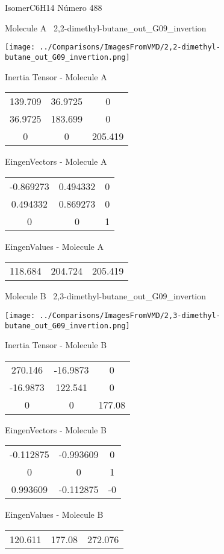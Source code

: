 \vtab[-3cm]
\begin{center}
{\large IsomerC6H14 \tab Número 488}
\end{center}
\begin{multicols}{2}
\begin{center}

Molecule A \
2,2-dimethyl-butane\_out\_G09\_invertion

\texttt{[image: ../Comparisons/ImagesFromVMD/2,2-dimethyl-butane\_out\_G09\_invertion.png]}

Inertia Tensor - Molecule A \\
\begin{tabular}{|c c c|}
139.709	 & 	36.9725	 & 	0	 \\
36.9725	 & 	183.699	 & 	0	 \\
0	 & 	0	 & 	205.419
\end{tabular}

\vtab
 EingenVectors - Molecule A     \\
\begin{tabular}{|c c c|}
-0.869273	 & 	0.494332	 & 	0	 \\
0.494332	 & 	0.869273	 & 	0	 \\
0	 & 	0	 & 	1
\end{tabular}

\vtab
 EingenValues - Molecule A     \\
\begin{tabular}{|c c c|}
118.684	 & 	204.724	 & 	205.419	 \\
\end{tabular}
\columnbreak

Molecule B \
2,3-dimethyl-butane\_out\_G09\_invertion

\texttt{[image: ../Comparisons/ImagesFromVMD/2,3-dimethyl-butane\_out\_G09\_invertion.png]}

Inertia Tensor - Molecule B \\
\begin{tabular}{|c c c|}
270.146	 & 	-16.9873	 & 	0	 \\
-16.9873	 & 	122.541	 & 	0	 \\
0	 & 	0	 & 	177.08
\end{tabular}

\vtab
 EingenVectors - Molecule B     \\
\begin{tabular}{|c c c|}
-0.112875	 & 	-0.993609	 & 	0	 \\
0	 & 	0	 & 	1	 \\
0.993609	 & 	-0.112875	 & 	-0
\end{tabular}

\vtab
 EingenValues - Molecule B     \\
\begin{tabular}{|c c c|}
120.611	 & 	177.08	 & 	272.076	 \\
\end{tabular}

\end{center}
\end{multicols}

